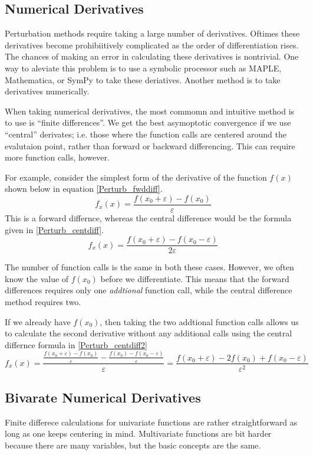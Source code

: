\documentclass[letterpaper,12pt]{article}
\newcommand{\ve}{\varepsilon}
\theoremstyle{definition}
\begin{document}
\begin{spacing}{1.5}
\section{Numerical Derivatives} \label{Perturb_NumDiff}
	Perturbation methods require taking a large number of derivatives.  Oftimes these derivatives become prohibiitively complicated as the order of differentiation rises.  The chances of making an error in calculating these derivatives is nontrivial.  One way to aleviate this problem is to use a symbolic processor such as MAPLE, Mathematica, or SymPy to take these deriatives.  Another method is to take derivatives numerically.

	When taking numerical derivatives, the most commomn and intuitive method is to use is ``finite differences''.  We get the best asymoptotic convergence if we use ``central'' derivates; i.e. those where the function calls are centered around the evalutaion point, rather than forward or backward differencing.  This can require more function calls, however.

	For example, consider the simplest form of the derivative of the function $f(x)$ shown below in equation \ref{Perturb_fwddiff}.
	\begin{equation} \label{Perturb_fwddiff}
		f_x(x) = \frac{f(x_0+\ve) - f(x_0)}{\ve}
	\end{equation}
	This is a forward differnce, whereas the central difference would be the formula given in \ref{Perturb_centdiff}.
	\begin{equation} \label{Perturb_centdiff}
		f_x(x) = \frac{f(x_0+\ve) - f(x_0-\ve)}{2\ve}
	\end{equation}

	The number of function calls is the same in both these cases.  However, we often know the value of $f(x_0)$ before we differentiate.  This means that the forward differences requires only one {\it addtional} function call, while the central difference method requires two.

	If we already have $f(x_0)$, then taking the two addtional function calls allows us to calculate the second derivative without any additional calls using the central differnce formula in \ref{Perturb_centdiff2}
	\begin{equation} \label{Perturb_centdiff2}
		f_x(x) = \frac{\frac{f(x_0+\ve) - f(x_0)}{\ve} - \frac{f(x_0) - f(x_0-\ve)}{\ve}}{\ve} = \frac{f(x_0+\ve)-2f(x_0)+f(x_0-\ve)}{\ve^2}
	\end{equation}

	\subsection{Bivarate Numerical Derivatives}
		Finite differece calculations for univariate functions are rather straightforward as long as one keeps centering in mind.  Multivariate functions are bit harder because there are many variables, but the basic concepts are the same.


\end{spacing}
\end{document}
